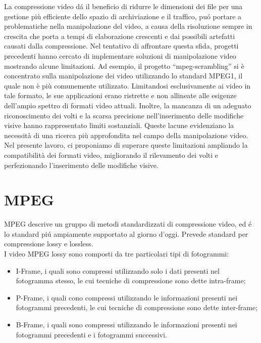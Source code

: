 \documentclass{report}
\begin{document}
La compressione video dá il beneficio di ridurre le dimensioni dei file per una gestione più efficiente dello spazio di archiviazione e il traffico, puó portare a problematiche nella manipolazione del video, a causa della risoluzione sempre in crescita che porta a tempi di elaborazione crescenti e dai possibili artefatti causati dalla compressione. Nel tentativo di affrontare questa sfida, progetti precedenti hanno cercato di implementare soluzioni di manipolazione video mostrando alcune limitazioni. Ad esempio, il progetto “mpeg-scrambling” si è concentrato sulla manipolazione dei video utilizzando lo standard MPEG1, il quale non è più comunemente utilizzato. Limitandosi esclusivamente ai video in tale formato, le sue applicazioni erano ristrette e non allineate alle esigenze dell’ampio spettro di formati video attuali. Inoltre, la mancanza di un adeguato riconoscimento dei volti e la scarsa precisione nell’inserimento delle modifiche visive hanno rappresentato limiti sostanziali. Queste lacune evidenziano la necessità di una ricerca più approfondita nel campo della manipolazione video. Nel presente lavoro, ci proponiamo di superare queste limitazioni ampliando la compatibilità dei formati video, migliorando il rilevamento dei volti e perfezionando l’inserimento delle modifiche visive.

\section{MPEG}
MPEG descrive un gruppo di metodi standardizzati di compressione video, ed é lo standard piú ampiamente supportato al giorno d'oggi. Prevede standard per compressione lossy e lossless. \\
I video MPEG lossy sono composti da tre particolari tipi di fotogrammi:

\begin{itemize}
        \item{I-Frame, i quali sono compressi utilizzando solo i dati presenti nel fotogramma stesso, le cui tecniche di compressione sono dette intra-frame;}
        \item{P-Frame, i quali cono compressi utilizzando le informazioni presenti nei fotogrammi precedenti, le cui tecniche di compressione sono dette inter-frame;}
        \item{B-Frame, i quali sono compressi utilizzando le informazioni presenti nei fotogrammi precedenti e i fotogrammi successivi.}
\end{itemize}
\end{document}
